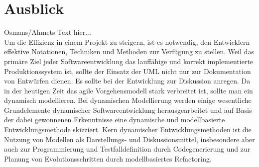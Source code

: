\chapter{Ausblick}

Osmans/Ahmets Text hier...
\\
Um die Effizienz in einem Projekt zu steigern, ist es notwendig, den Entwicklern effektive Notationen, Techniken und Methoden zur Verfügung zu stellen. Weil das primäre Ziel jeder Softwareentwicklung das lauffähige und korrekt implementierte Produktionssystem ist, sollte der Einsatz der UML nicht nur zur Dokumentation von Entwürfen dienen. Es sollte bei der Entwicklung zur Diskussion anregen. Da in der heutigen Zeit das agile Vorgehensmodell stark verbreitet ist, sollte man ein dynamisch modellieren. Bei dynamischen Modellierung werden einige wesentliche Grundelemente dynamischer Softwareentwicklung herausgearbeitet und auf Basis der dabei gewonnenen Erkenntnisse eine dynamische und modellbasierte Entwicklungsmethode skizziert. Kern dynamischer Entwicklungsmethoden ist die Nutzung von Modellen als Darstellungs- und Diskussionsmittel, insbesondere aber auch zur Programmierung und Testfalldefinition durch Codegenerierung und zur Planung von Evolutionsschritten durch modellbasiertes Refactoring.